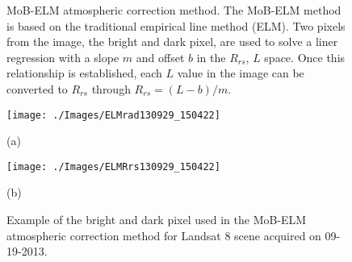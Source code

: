 \documentclass[draft]{spie}  %
\begin{document}
\begin{figure}[htb]
	\centering
\caption{MoB-ELM atmospheric correction method. The MoB-ELM method is based on the traditional empirical line method (ELM). Two pixels from the image, the bright and dark pixel, are used to solve a liner regression with a slope $m$ and offset $b$ in the $R_{rs}$, $L$ space. Once this relationship is established, each $L$ value in the image can be converted to $R_{rs}$ through $R_{rs}=(L-b)/m$. \label{fig:ELMregression}}
\end{figure}

\begin{figure}[htb]
  \begin{minipage}[c]{0.48\linewidth}
    \centering
      \texttt{[image: ./Images/ELMrad130929\_150422]}
    \centerline{(a)}\medskip
  \end{minipage}
  \hfill
  \begin{minipage}[d]{0.48\linewidth}
    \centering
      \texttt{[image: ./Images/ELMRrs130929\_150422]}
    \centerline{(b)}\medskip
  \end{minipage}
  \caption{Example of the bright and dark pixel used in the MoB-ELM atmospheric correction method for Landsat 8 scene acquired on 09-19-2013.\label{fig:MOBELMpxls} } 
\end{figure}
\end{document}
